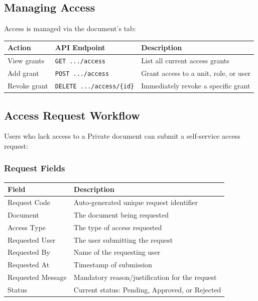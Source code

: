 \subsection{Managing Access}

Access is managed via the document's  tab:

\begin{tabularx}{\textwidth}{@{} l l X @{}}
  \toprule
  \textbf{Action} & \textbf{API Endpoint}
    & \textbf{Description} \\
  \midrule
  View grants
    & \texttt{GET .../access}
    & List all current access grants \\
  Add grant
    & \texttt{POST .../access}
    & Grant access to a unit, role, or user \\
  Revoke grant
    & \texttt{DELETE .../access/\{id\}}
    & Immediately revoke a specific grant \\
  \bottomrule
\end{tabularx}

\subsection{Access Request Workflow}

Users who lack access to a Private document can submit a
self-service access request:

\subsubsection*{Request Fields}

\begin{tabularx}{\textwidth}{@{} l X @{}}
  \toprule
  \textbf{Field} & \textbf{Description} \\
  \midrule
  Request Code
    & Auto-generated unique request identifier \\
  Document
    & The document being requested \\
  Access Type
    & The type of access requested \\
  Requested User
    & The user submitting the request \\
  Requested By
    & Name of the requesting user \\
  Requested At
    & Timestamp of submission \\
  Requested Message
    & Mandatory reason/justification for the
      request \\
  Status
    & Current status: Pending, Approved, or
      Rejected \\
  \bottomrule
\end{tabularx}

